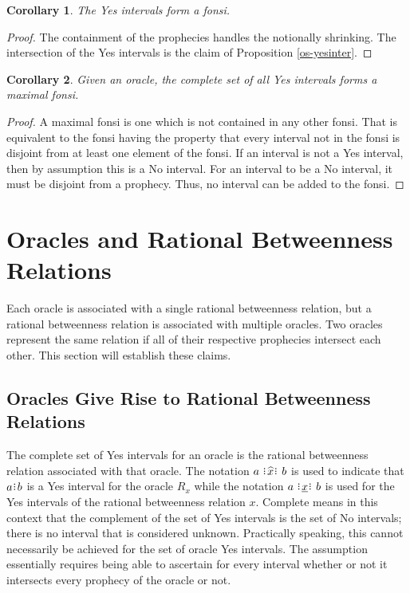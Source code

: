\documentclass[12pt]{article}
\newtheorem{corollary}{Corollary}[section]
\begin{document}
\begin{corollary}
    The Yes intervals form a fonsi. 
\end{corollary}

\begin{proof}
    The containment of the prophecies handles the notionally shrinking. The intersection of the Yes intervals is the claim of Proposition \ref{os-yesinter}.
\end{proof}

\begin{corollary}
    Given an oracle, the complete set of all Yes intervals forms a maximal fonsi.
\end{corollary}

\begin{proof}
A maximal fonsi is one which is not contained in any other fonsi. That is equivalent to the fonsi having the property that every interval not in the fonsi is disjoint from at least one element of the fonsi. If an interval is not a Yes interval, then by assumption this is a No interval. For an interval to be a No interval, it must be disjoint from a prophecy. Thus, no interval can be added to the fonsi. 
\end{proof}



\section{Oracles and Rational Betweenness Relations}

Each oracle is associated with a single rational betweenness relation, but a rational betweenness relation is associated with multiple oracles. Two oracles represent the same relation if all of their respective prophecies intersect each other. This section will establish these claims. 

\subsection{Oracles Give Rise to Rational Betweenness Relations}

The complete set of Yes intervals for an oracle is the rational betweenness relation associated with that oracle. The notation $a \xora b$ is used to indicate that $a\rint b$ is a Yes interval for the oracle $R_x$ while the notation $a \xrel b$ is used for the Yes intervals of the rational betweenness relation $x$. Complete means in this context that the complement of the set of Yes intervals is the set of No intervals; there is no interval that is considered unknown. Practically speaking, this cannot necessarily be achieved for the set of oracle Yes intervals. The assumption essentially requires being able to ascertain for every interval whether or not it intersects every prophecy of the oracle or not. 
\end{document}
